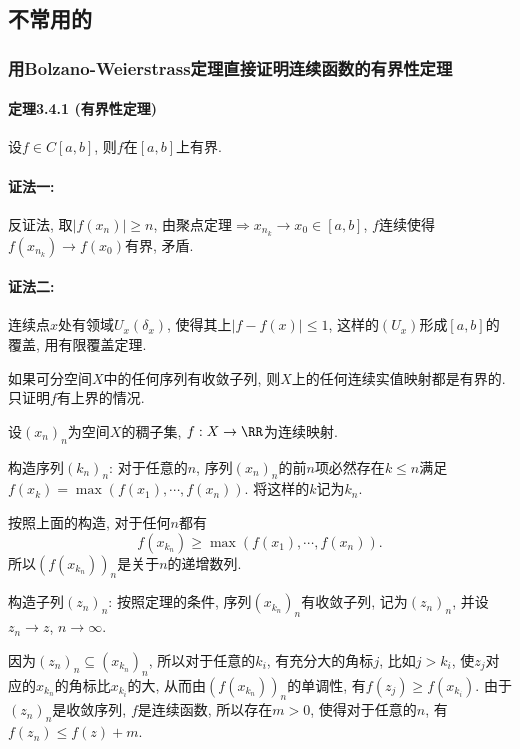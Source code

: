 \subsection{不常用的}

\subsubsection{用Bolzano-Weierstrass定理直接证明连续函数的有界性定理}
\paragraph{定理3.4.1 (有界性定理)}

设$f\in C[a,b]$, 则$f$在$[a,b]$上有界.

\paragraph{证法一:}

反证法, 取$\left|f(x_{n})\right|\ge n$, 由聚点定理$\Longrightarrow x_{n_{k}}\to x_{0}\in[a,b]$,
$f$连续使得$f(x_{n_{k}})\to f(x_{0})$有界, 矛盾.

\paragraph{证法二:}

连续点$x$处有领域$U_{x}(\delta_{x})$, 使得其上$\left|f-f(x)\right|\le1$, 这样的$\left(U_{x}\right)$形成$[a,b]$的覆盖,
用有限覆盖定理.

\bt{}{}
如果可分空间$X$中的任何序列有收敛子列, 则$X$上的任何连续实值映射都是有界的.
\et
\ba
只证明$f$有上界的情况.

设$\left(x_{n}\right)_{n}$为空间$X$的稠子集, $f:X\to\RR$为连续映射.

构造序列$\left(k_{n}\right)_{n}$: 对于任意的$n$, 序列$\left(x_{n}\right)_{n}$的前$n$项必然存在$k\le n$满足$f(x_{k})=\max\left(f(x_{1}),\cdots,f(x_{n})\right)$.
将这样的$k$记为$k_{n}$.

按照上面的构造, 对于任何$n$都有
\[
f\left(x_{k_{n}}\right)\ge\max\left(f(x_{1}),\cdots,f(x_{n})\right).
\]
所以$\left(f\left(x_{k_{n}}\right)\right)_{n}$是关于$n$的递增数列.

构造子列$\left(z_{n}\right)_{n}$: 按照定理的条件, 序列$\left(x_{k_{n}}\right)_{n}$有收敛子列,
记为$\left(z_{n}\right)_{n}$, 并设$z_{n}\to z$, $n\to\infty$. 

因为$\left(z_{n}\right)_{n}\subseteq\left(x_{k_{n}}\right)_{n}$, 所以对于任意的$k_{i}$,
有充分大的角标$j$, 比如$j>k_{i}$, 使$z_{j}$对应的$x_{k_{n}}$的角标比$x_{k_{i}}$的大,
从而由$\left(f\left(x_{k_{n}}\right)\right)_{n}$的单调性, 有$f(z_{j})\ge f\left(x_{k_{i}}\right)$.
由于$\left(z_{n}\right)_{n}$是收敛序列, $f$是连续函数, 所以存在$m>0$, 使得对于任意的$n$,
有$f(z_{n})\le f(z)+m$.

